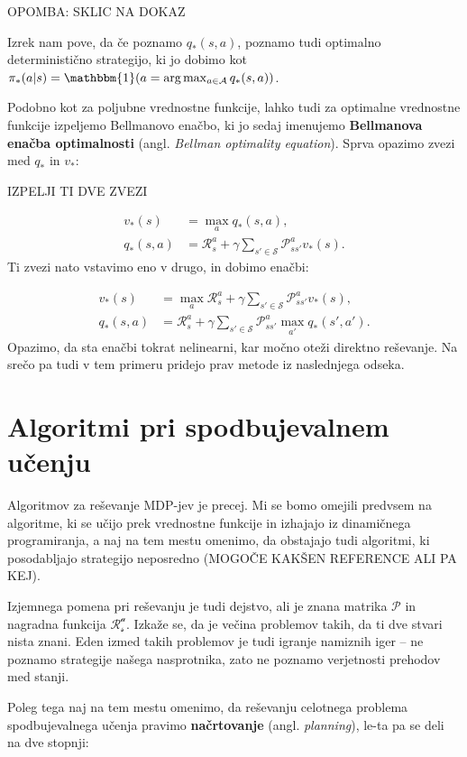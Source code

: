\documentclass[12pt,a4paper]{amsart}
\theoremstyle{definition} %
\theoremstyle{plain} %
\begin{document}
OPOMBA: SKLIC NA DOKAZ

Izrek nam pove, da če poznamo $q_*(s, a)$, poznamo tudi optimalno deterministično strategijo, 
ki jo dobimo kot $\pi_*(a|s) = \mathbbm{1} (a =\text{arg}\max_{a \in \mathcal{A}} q_*(s, a))$.

Podobno kot za poljubne vrednostne funkcije, lahko tudi za optimalne vrednostne funkcije 
izpeljemo Bellmanovo enačbo, ki jo sedaj imenujemo \textbf{Bellmanova enačba optimalnosti} (angl. 
\textit{Bellman optimality equation}). Sprva opazimo zvezi med $q_*$ in $v_*$:

IZPELJI TI DVE ZVEZI

\begin{align*}
    v_*(s) &= \max_a q_*(s, a), \\
    q_*(s, a) &= \mathcal{R}_s^a + \gamma \sum_{s' \in \mathcal{S}} \mathcal{P}_{ss'}^a v_*(s).
\end{align*}
Ti zvezi nato vstavimo eno v drugo, in dobimo enačbi: 

\begin{align}\label{beo}
    v_*(s) &= \max_a \mathcal{R}_s^a + \gamma \sum_{s' \in \mathcal{S}} \mathcal{P}_{ss'}^a v_*(s), \\
    q_*(s, a) &= \mathcal{R}_s^a + 
                \gamma \sum_{s' \in \mathcal{S}} \mathcal{P}_{ss'}^a \max_{a'} q_*(s', a').
\end{align}
Opazimo, da sta enačbi tokrat nelinearni, kar močno oteži direktno reševanje. Na srečo pa tudi 
v tem primeru pridejo prav metode iz naslednjega odseka.

\section{Algoritmi pri spodbujevalnem učenju}
Algoritmov za reševanje MDP-jev je precej. Mi se bomo omejili predvsem na algoritme, ki se učijo 
prek vrednostne funkcije in izhajajo iz dinamičnega programiranja, a naj na tem mestu omenimo, 
da obstajajo tudi algoritmi, ki posodabljajo strategijo neposredno (MOGOČE KAKŠEN REFERENCE ALI 
PA KEJ).

Izjemnega pomena pri reševanju je tudi dejstvo, ali je znana matrika $\mathcal{P}$ in nagradna 
funkcija $\mathcal{R_s^a}$. Izkaže se, da je večina problemov takih, da ti dve stvari nista znani. 
Eden izmed takih problemov je tudi igranje namiznih iger -- ne poznamo strategije našega nasprotnika, 
zato ne poznamo verjetnosti prehodov med stanji.

Poleg tega naj na tem mestu omenimo, da reševanju celotnega problema spodbujevalnega učenja 
pravimo \textbf{načrtovanje} (angl. \textit{planning}), le-ta pa se deli na dve stopnji: 
\end{document}
